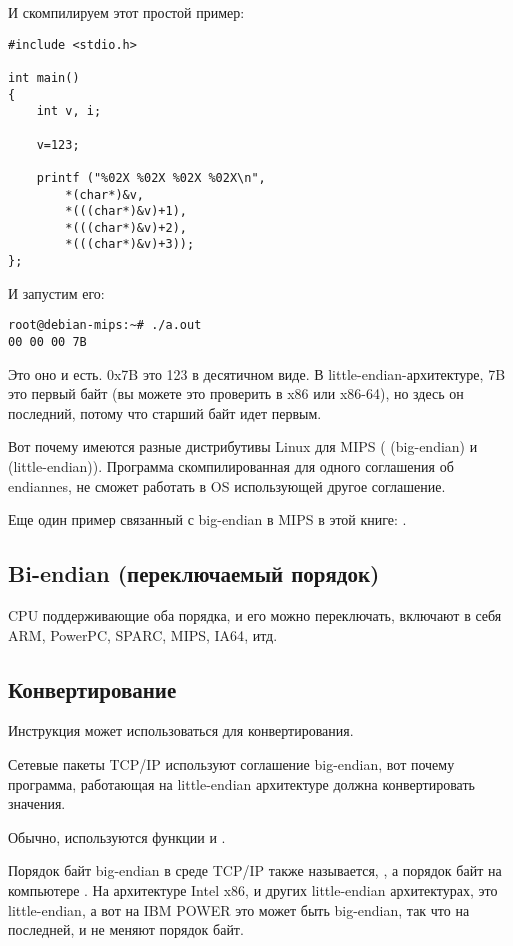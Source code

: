 И скомпилируем этот простой пример:

\begin{lstlisting}[style=customc]
#include <stdio.h>

int main()
{
	int v, i;

	v=123;

	printf ("%02X %02X %02X %02X\n", 
		*(char*)&v,
		*(((char*)&v)+1),
		*(((char*)&v)+2),
		*(((char*)&v)+3));
};
\end{lstlisting}

И запустим его:

\begin{lstlisting}
root@debian-mips:~# ./a.out 
00 00 00 7B
\end{lstlisting}

Это оно и есть.
0x7B это 123 в десятичном виде.
В little-endian-архитектуре, 7B это первый байт (вы можете это проверить в x86 или x86-64),
но здесь он последний, потому что старший байт идет первым.

Вот почему имеются разные дистрибутивы Linux для MIPS
( (big-endian) и  (little-endian)).
Программа скомпилированная для одного соглашения об endiannes, не сможет работать в OS использующей
другое соглашение.

Еще один пример связанный с big-endian в MIPS в этой книге: .

\subsection{Bi-endian (переключаемый порядок)}

CPU поддерживающие оба порядка, и его можно переключать, включают в себя ARM, PowerPC, SPARC, MIPS, \ac{IA64}, итд.

\subsection{Конвертирование}

Инструкция  может использоваться для конвертирования.

Сетевые пакеты TCP/IP используют соглашение big-endian, вот почему программа, работающая на little-endian архитектуре
должна конвертировать значения.

Обычно, используются функции  и .

Порядок байт big-endian в среде TCP/IP также называется, ,
а порядок байт на компьютере .
На архитектуре Intel x86, и других little-endian архитектурах,  это little-endian, 
а вот на IBM POWER это может быть big-endian, так что на последней, 
 и  не меняют порядок байт.

